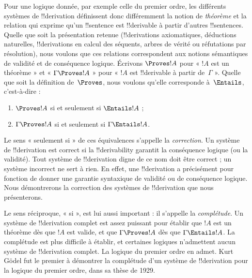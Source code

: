 \documentclass[../../../include/open-logic-section]{subfiles}
\begin{document}
Pour une logique donnée, par exemple celle du premier ordre, les
différents systèmes de !!{derivation} définissent donc différemment la
notion de \emph{théorème} et la relation qui exprime qu'un !!{sentence}
est !!{derivable} à partir d'autres !!{sentence}s.
Quelle que soit la présentation retenue (!!{derivation}s axiomatiques,
déductions naturelles, !!{derivation}s en calcul des séquents, arbres de
vérité ou réfutations par résolution), nous voulons que ces relations
correspondent aux notions sémantiques de validité et de conséquence
logique. Écrivons $\Proves !A$ pour « $!A$ est un théorème » et
« $\Gamma \Proves !A$ » pour « $!A$ est !!{derivable} à partir
de~$\Gamma$ ». Quelle que soit la définition de~$\Proves$, nous voulons
qu'elle corresponde à~$\Entails$, c'est-à-dire :
\begin{enumerate}
\item $\Proves !A$ si et seulement si $\Entails !A$ ;
\item $\Gamma \Proves !A$ si et seulement si $\Gamma \Entails !A$.
\end{enumerate}
Le sens « seulement si » de ces équivalences s'appelle la
\emph{correction}. Un système de !!{derivation} est correct si la
!!{derivability} garantit la conséquence logique (ou la validité).
Tout système de !!{derivation} digne de ce nom doit être correct ; un
système incorrect ne sert à rien. En effet, une !!{derivation} a
précisément pour fonction de donner une garantie syntaxique de validité
ou de conséquence logique. Nous démontrerons la correction des systèmes
de !!{derivation} que nous présenterons.

Le sens réciproque, « si », est lui aussi important : il s'appelle la
\emph{complétude}. Un système de !!{derivation} complet est assez
puissant pour établir que $!A$ est un théorème dès que $!A$ est valide,
et que $\Gamma \Proves !A$ dès que $\Gamma \Entails !A$.
La complétude est plus difficile à établir, et certaines logiques
n'admettent aucun système de !!{derivation} complet. La logique du
premier ordre en admet. Kurt G\"odel fut le premier à démontrer la
complétude d'un système de !!{derivation} pour la logique du premier
ordre, dans sa thèse de 1929.
\end{document}
